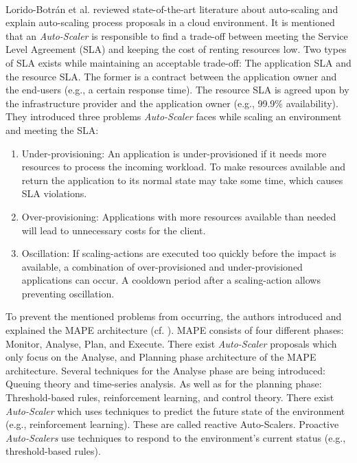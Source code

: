 \paragraph{}
Lorido-Botrán et al. \cite{Lorido2014Review} reviewed state-of-the-art literature about auto-scaling and explain auto-scaling process proposals in a cloud environment.
It is mentioned that an \textit{Auto-Scaler} is responsible to find a trade-off between meeting the Service Level Agreement (SLA) and keeping the cost of renting resources low.
Two types of SLA exists while maintaining an acceptable trade-off: The application SLA and the resource SLA. The former is a contract between the application owner and the end-users (e.g., a certain response time). The resource SLA is agreed upon by the infrastructure provider and the application owner (e.g., 99.9\% availability).
They introduced three problems \textit{Auto-Scaler} faces while scaling an environment and meeting the SLA:
\begin{enumerate}
\item Under-provisioning:
An application is under-provisioned if it needs more resources to process the incoming workload.
To make resources available and return the application to its normal state may take some time, which causes SLA violations.
\item Over-provisioning:
Applications with more resources available than needed will lead to unnecessary costs for the client.
\item Oscillation:
If scaling-actions are executed too quickly before the impact is available, a combination of over-provisioned and under-provisioned applications can occur.
A cooldown period after a scaling-action allows preventing oscillation.
\end{enumerate}
To prevent the mentioned problems from occurring, the authors introduced and explained the MAPE architecture (cf. ).
MAPE consists of four different phases: Monitor, Analyse, Plan, and Execute.
There exist \textit{Auto-Scaler} proposals which only focus on the Analyse, and Planning phase architecture of the MAPE architecture.
Several techniques for the Analyse phase are being introduced: Queuing theory and time-series analysis.
As well as for the planning phase: Threshold-based rules, reinforcement learning, and control theory.
There exist \textit{Auto-Scaler} which uses techniques to predict the future state of the environment (e.g., reinforcement learning). These are called reactive Auto-Scalers.
Proactive \textit{Auto-Scalers} use techniques to respond to the environment's current status (e.g., threshold-based rules).


